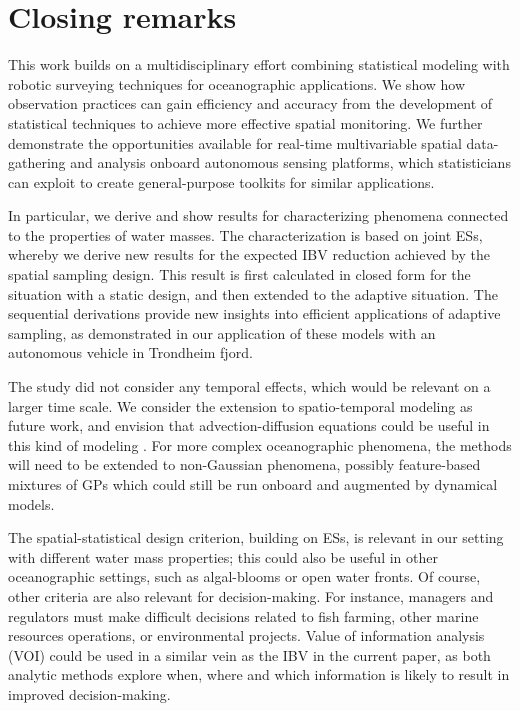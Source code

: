 \documentclass[aoas]{imsart}
\begin{document}
\newpage
\section{Closing remarks}\label{sec:concl_disc}

This work builds on a multidisciplinary effort combining statistical
modeling with robotic surveying techniques for oceanographic
applications. We show how observation practices can gain efficiency
and accuracy from the development of statistical techniques to achieve
more effective spatial monitoring. We further demonstrate the
opportunities available for real-time multivariable spatial
data-gathering and analysis onboard autonomous sensing platforms,
which statisticians can exploit to create general-purpose toolkits for
similar applications.

In particular, we derive and show results for characterizing phenomena
connected to the properties of water masses. The characterization is
based on joint ESs, whereby we derive new results for the expected IBV
reduction achieved by the spatial sampling design. This result is
first calculated in closed form for the situation with a static
design, and then extended to the adaptive situation. The sequential
derivations provide new insights into efficient applications of
adaptive sampling, as demonstrated in our application of these models
with an autonomous vehicle in Trondheim fjord.

The study did not consider any temporal effects, which would be
relevant on a larger time scale. We consider the extension to
spatio-temporal modeling as future work, and envision that
advection-diffusion equations could be useful in this kind of modeling
\citep{sigrist2015stochastic}. For more complex oceanographic
phenomena, the methods will need to be extended to non-Gaussian
phenomena, possibly feature-based mixtures of GPs which could still be
run onboard and augmented by dynamical models.

The spatial-statistical design criterion, building on ESs, is relevant
in our setting with different water mass properties; this could also
be useful in other oceanographic settings, such as algal-blooms or
open water fronts. Of course, other criteria are also relevant for
decision-making. For instance, managers and regulators must make
difficult decisions related to fish farming, other marine resources
operations, or environmental projects. Value of information analysis
(VOI) \citep{Eidsvik:15} could be used in a similar vein as the IBV in
the current paper, as both analytic methods explore when, where and
which information is likely to result in improved decision-making.
\end{document}
